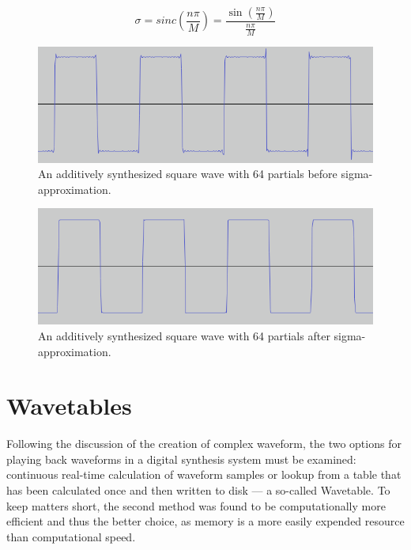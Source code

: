   \begin{equation}
    \sigma = sinc(\frac{n\pi}{M}) = \frac{\sin(\frac{n\pi}{M})}{\frac{n\pi}{M}}
    \label{eq:lanczos}
  \end{equation}

  \begin{figure}
    \includegraphics[scale=0.5]{img/gibbsb}
    \caption{An additively synthesized square wave with 64 partials before sigma-approximation.}
    \label{fig:gibbsb}
  \end{figure}

  \begin{figure}
    \includegraphics[scale=0.5]{img/gibbsa}
    \caption{An additively synthesized square wave with 64 partials after sigma-approximation.}
    \label{fig:gibbsa}
  \end{figure}

  \pagebreak

  \section{Wavetables}

  Following the discussion of the creation of complex waveform, the two options for playing back waveforms in a digital synthesis system must be examined: continuous real-time calculation of waveform samples or lookup from a table that has been calculated once and then written to disk --- a so-called Wavetable. To keep matters short, the second method was found to be computationally more efficient and thus the better choice, as memory is a more easily expended resource than computational speed.

